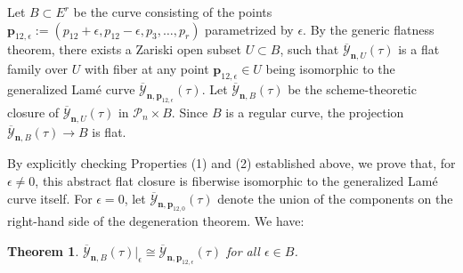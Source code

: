 \documentclass[11pt]{amsart}
\newtheorem{theorem}{Theorem}[section]
\theoremstyle{remark}
\numberwithin{equation}{section}
\begin{document}
\vspace{5mm}


Let $B \subset E^r$ be the curve consisting of the points $\mathbf{p}_{12,\epsilon} := (p_{12} + \epsilon, p_{12}-\epsilon, p_3, \dots, p_r)$ parametrized by $\epsilon$. By the generic flatness theorem, there exists a Zariski open subset $U \subset B$, such that $\overline{\mathcal{Y}}_{\mathbf{n},U}(\tau)$ is a flat family over $U$ with fiber at any point $\mathbf{p}_{12,\epsilon} \in U$ being isomorphic to the generalized Lam\'e curve $\overline{\mathcal{Y}}_{\mathbf{n}, \mathbf{p}_{12,\epsilon}}(\tau)$. Let $\overline{\mathcal{Y}}_{\mathbf{n},B}(\tau)$ be the scheme-theoretic closure of $\overline{\mathcal{Y}}_{\mathbf{n},U}(\tau)$ in $\mathcal{P}_n \times B$. Since $B$ is a regular curve, the projection $\overline{\mathcal{Y}}_{\mathbf{n},B}(\tau) \rightarrow B$ is flat.

By explicitly checking Properties (1) and (2) established above, we prove that, for $\epsilon \neq 0$, this abstract flat closure is fiberwise isomorphic to the generalized Lam\'e curve itself. For $\epsilon=0$, let $\overline{\mathcal{Y}}_{\mathbf{n}, \mathbf{p}_{12,0}}(\tau)$ denote the union of the components on the right-hand side of the degeneration theorem. We have:

\begin{theorem}
$\overline{\mathcal{Y}}_{\mathbf{n},B}(\tau)|_\epsilon \cong \overline{\mathcal{Y}}_{\mathbf{n}, \mathbf{p}_{12,\epsilon}}(\tau)$ for all $\epsilon\in B$.
\end{theorem}
\end{document}
